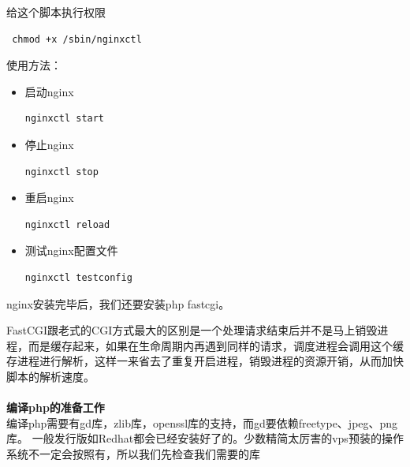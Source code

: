 \documentclass{article}
\begin{document}
给这个脚本执行权限

\begin{verbatim}
 chmod +x /sbin/nginxctl
\end{verbatim}

使用方法：

\begin{itemize}
\item 启动nginx
\begin{verbatim}
nginxctl start
\end{verbatim}
\item 停止nginx
\begin{verbatim}
nginxctl stop
\end{verbatim}
\item 重启nginx
\begin{verbatim}
nginxctl reload
\end{verbatim}
\item 测试nginx配置文件
\begin{verbatim}
nginxctl testconfig
\end{verbatim}
\end{itemize}

nginx安装完毕后，我们还要安装php fastcgi。

FastCGI跟老式的CGI方式最大的区别是一个处理请求结束后并不是马上销毁进程，而是缓存起来，如果在生命周期内再遇到同样的请求，调度进程会调用这个缓存进程进行解析，这样一来省去了重复开启进程，销毁进程的资源开销，从而加快脚本的解析速度。

\paragraph{}\textbf{编译php的准备工作}\\

编译php需要有gd库，zlib库，openssl库的支持，而gd要依赖freetype、jpeg、png库。
一般发行版如Redhat都会已经安装好了的。少数精简太厉害的vps预装的操作系统不一定会按照有，所以我们先检查我们需要的库
\end{document}
